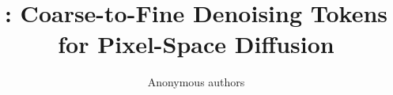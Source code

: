 \documentclass{article}
\title{\method: Coarse-to-Fine Denoising Tokens for Pixel-Space Diffusion}
\author{Anonymous authors}
\begin{document}
\maketitle














\clearpage
\appendix
\setcounter{table}{0}
\setcounter{figure}{0}
\renewcommand{\thetable}{A\arabic{table}}
\renewcommand{\thefigure}{A\arabic{figure}}
\renewcommand{\theHtable}{A\arabic{table}}
\renewcommand{\theHfigure}{A\arabic{figure}}









\end{document}

